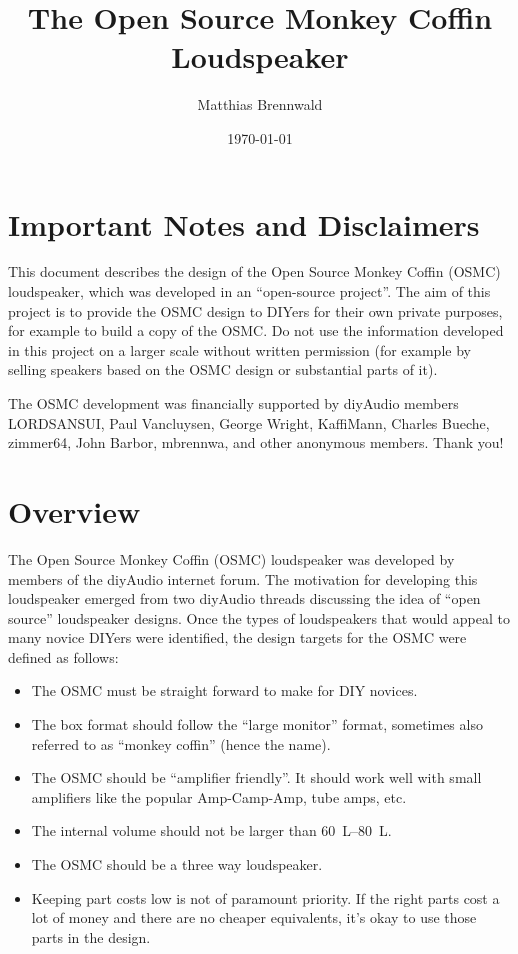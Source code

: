 \documentclass[12pt,a4paper]{article}
\title{The Open Source Monkey Coffin Loudspeaker}
\author{Matthias Brennwald}
\date{\today}
\begin{document}
\maketitle

\vspace{0.2\textheight}

\section*{Important Notes and Disclaimers}
This document describes the design of the Open Source Monkey Coffin (OSMC) loudspeaker, which was developed in an ``open-source project''\cite{osmc_p1}. The aim of this project is to provide the OSMC design to DIYers for their own private purposes, for example to build a copy of the OSMC. Do not use the information developed in this project on a larger scale without written permission (for example by selling speakers based on the OSMC design or substantial parts of it).\par

The OSMC development was financially supported by diyAudio members LORDSANSUI, Paul Vancluysen, George Wright, KaffiMann, Charles Bueche, zimmer64, John Barbor, mbrennwa, and other anonymous members. Thank you!

\clearpage

\section{Overview}
The Open Source Monkey Coffin (OSMC) loudspeaker was developed by members of the diyAudio internet forum\cite{osmc_p1}. The motivation for developing this loudspeaker emerged from two diyAudio threads discussing the idea of ``open source'' loudspeaker designs\cite{osproj1_p1,osproj2_p1}. Once the types of loudspeakers that would appeal to many novice DIYers were identified, the design targets for the OSMC were defined as follows:

\begin{itemize}
\item The OSMC must be straight forward to make for DIY novices.
\item The box format should follow the ``large monitor'' format, sometimes also referred to as ``monkey coffin'' (hence the name).
\item The OSMC should be ``amplifier friendly''. It should work well with small amplifiers like the popular Amp-Camp-Amp, tube amps, etc.
\item The internal volume should not be larger than \SIrange{60}{80}{L}.
\item The OSMC should be a three way loudspeaker.
\item Keeping part costs low is not of paramount priority. If the right parts cost a lot of money and there are no cheaper equivalents, it's okay to use those parts in the design.
\end{itemize}
\end{document}
